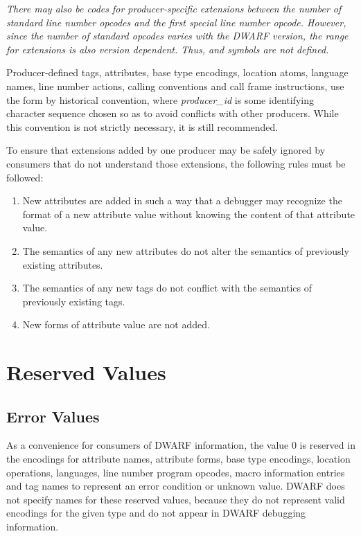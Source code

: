 \textit{There may also be codes for 
\bb
producer-specific 
\eb
extensions
between the number of standard line number opcodes and
the first special line number opcode. However, since the
number of standard opcodes varies with the DWARF version,
the range for extensions is also version dependent. Thus,
\DWLNSlouserTARG{} and 
\DWLNShiuserTARG{} symbols are not defined.}

Producer-defined 
\bbeb
tags, attributes, base type encodings, location
atoms, language names, line number actions, calling conventions
and call frame instructions, 
\bb
use the form
 by historical convention, where 
\textit{producer\_id} 
\eb
is some identifying
character sequence chosen so as to avoid conflicts with other 
\bb
producers. While this convention is not strictly necessary, 
it is still recommended.
\eb

To ensure that extensions added by one 
\bb
producer 
\eb
may be safely
ignored by consumers that do not understand those extensions,
the following rules must be followed:
\begin{enumerate}[1. ]

\item New attributes are added in such a way that a
debugger may recognize the format of a new attribute value
without knowing the content of that attribute value.

\item The semantics of any new attributes do not alter
the semantics of previously existing attributes.

\item The semantics of any new tags do not conflict with
the semantics of previously existing tags.

\item New forms of attribute value are not added.

\end{enumerate}


\section{Reserved Values}
\label{datarep:reservedvalues}
\subsection{Error Values}
\label{datarep:errorvalues}

As 
a convenience for consumers of DWARF information, the value
0 is reserved in the encodings for attribute names, attribute
forms, base type encodings, location operations, languages,
line number program opcodes, macro information entries and tag
names to represent an error condition or unknown value. DWARF
does not specify names for these reserved values, because they
do not represent valid encodings for the given type and do
not appear in DWARF debugging information.


